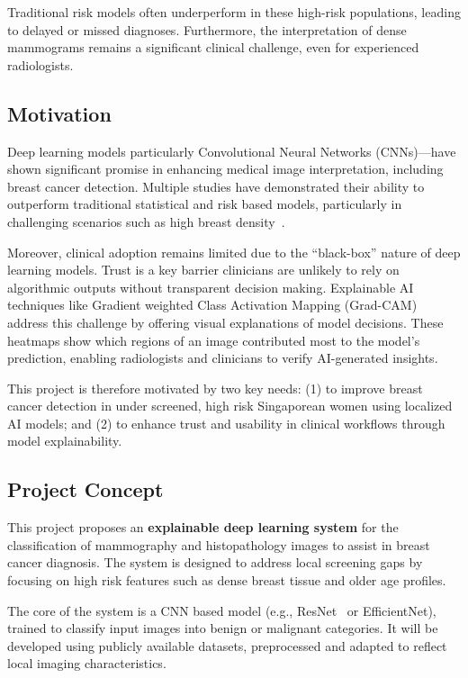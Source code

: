 \documentclass[12pt]{article}
\begin{document}
Traditional risk models often underperform in these high-risk populations, leading to delayed or missed diagnoses. Furthermore, the interpretation of dense mammograms remains a significant clinical challenge, even for experienced radiologists. 

\subsection{Motivation}
Deep learning models particularly Convolutional Neural Networks (CNNs)—have shown significant promise in enhancing medical image interpretation, including breast cancer detection. Multiple studies have demonstrated their ability to outperform traditional statistical and risk based models, particularly in challenging scenarios such as high breast density~\cite{1,7,13}. 

Moreover, clinical adoption remains limited due to the ``black-box'' nature of deep learning models. Trust is a key barrier clinicians are unlikely to rely on algorithmic outputs without transparent decision making. Explainable AI techniques like Gradient weighted Class Activation Mapping (Grad-CAM)~\cite{5} address this challenge by offering visual explanations of model decisions. These heatmaps show which regions of an image contributed most to the model's prediction, enabling radiologists and clinicians to verify AI-generated insights.

This project is therefore motivated by two key needs: (1) to improve breast cancer detection in under screened, high risk Singaporean women using localized AI models; and (2) to enhance trust and usability in clinical workflows through model explainability.

\subsection{Project Concept}
This project proposes an \textbf{explainable deep learning system} for the classification of mammography and histopathology images to assist in breast cancer diagnosis. The system is designed to address local screening gaps by focusing on high risk features such as dense breast tissue and older age profiles.

The core of the system is a CNN based model (e.g., ResNet~\cite{17} or EfficientNet), trained to classify input images into benign or malignant categories. It will be developed using publicly available datasets, preprocessed and adapted to reflect local imaging characteristics.
\end{document}
